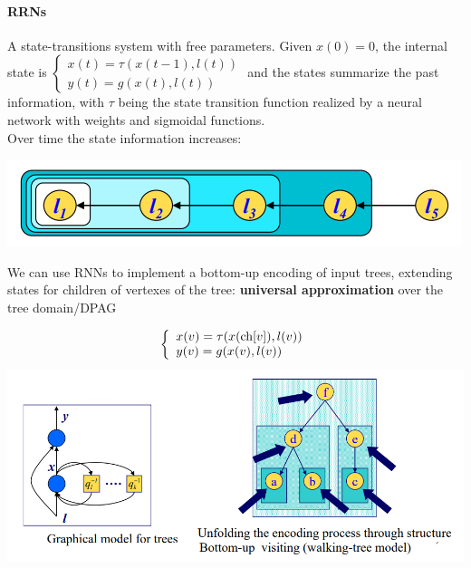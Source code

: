 \documentclass[10pt]{report}
\begin{document}
\paragraph{RRNs} A state-transitions system with free parameters. Given $x(0) = 0$, the internal state is $\left\{\begin{array}{l}
x(t)=\tau(x(t-1),l(t))\\
y(t)=g(x(t),l(t))
\end{array}\right.$ and the states summarize the past information, with $\tau$ being the state transition function realized by a neural network with weights and sigmoidal functions.\\
Over time the state information increases:
\begin{center}
	\includegraphics[scale=0.75]{41.png}
\end{center}
We can use RNNs to implement a bottom-up encoding of input trees, extending states for children of vertexes of the tree: \textbf{universal approximation} over the tree domain/DPAG
\begin{center}
	$$\left\{\begin{array}{l}
x(v)=\tau(x(\hbox{ch}[v]),l(v))\\
y(v)=g(x(v),l(v))
\end{array}\right.$$
	\includegraphics[scale=0.7]{42.png}
\end{center}
\end{document}
